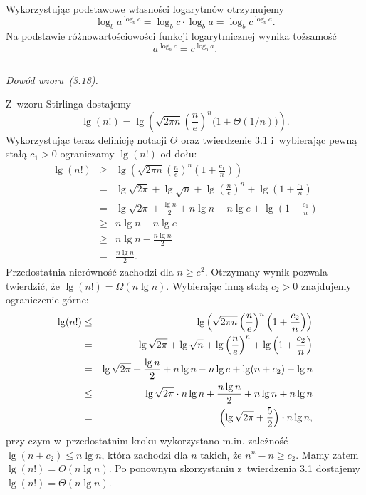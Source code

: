\subsection{} %
Wykorzystując podstawowe własności logarytmów otrzymujemy
\[
	\log_ba^{\log_bc} = \log_bc\cdot\log_ba = \log_bc^{\log_ba}.
\]
Na podstawie różnowartościowości funkcji logarytmicznej wynika tożsamość
\[
	a^{\log_bc} = c^{\log_ba}.
\]

\subsection{} %
\noindent\emph{Dowód wzoru~(3.18).}

\noindent Z~wzoru Stirlinga dostajemy
\[
	\lg(n!) = \lg\left(\sqrt{2\pi n}\left(\frac{n}{e}\right)^n\bigl(1+\Theta(1/n)\bigr)\right).
\]
Wykorzystując teraz definicję notacji $\Theta$ oraz twierdzenie 3.1 i~wybierając pewną stałą $c_1>0$ ograniczamy $\lg(n!)$ od dołu:
\begin{eqnarray*}
	\lg(n!) &\ge& \lg\left(\sqrt{2\pi n}\left(\frac{n}{e}\right)^n\left(1+\frac{c_1}{n}\right)\right) \\
	&=& \lg\sqrt{2\pi}+\lg\sqrt{n}+\lg\left(\frac{n}{e}\right)^n+\lg\left(1+\frac{c_1}{n}\right) \\
	&=& \lg\sqrt{2\pi}+\frac{\lg n}{2}+n\lg n-n\lg e+\lg\left(1+\frac{c_1}{n}\right) \\
	&\ge& n\lg n-n\lg e\\
	&\ge& n\lg n-\frac{n\lg n}{2} \\
	&=& \frac{n\lg n}{2}.
\end{eqnarray*}
Przedostatnia nierówność zachodzi dla $n\ge e^2$. Otrzymany wynik pozwala twierdzić, że $\lg(n!)=\Omega(n\lg n)$. Wybierając inną stałą $c_2>0$ znajdujemy ograniczenie górne:
\begin{eqnarray*}
	\lg(n!) &\le& \lg\left(\sqrt{2\pi n}\left(\frac{n}{e}\right)^n\left(1+\frac{c_2}{n}\right)\right) \\
	&=& \lg\sqrt{2\pi}+\lg\sqrt{n}+\lg\left(\frac{n}{e}\right)^n+\lg\left(1+\frac{c_2}{n}\right) \\
	&=& \lg\sqrt{2\pi}+\frac{\lg n}{2}+n\lg n-n\lg e+\lg(n+c_2)-\lg n\\
	&\le& \lg\sqrt{2\pi}\cdot n\lg n+\frac{n\lg n}{2}+n\lg n+n\lg n\\
	&=& \Bigl(\lg\sqrt{2\pi}+\frac{5}{2}\Bigr)\cdot n\lg n,
\end{eqnarray*}
przy czym w~przedostatnim kroku wykorzystano m.in. zależność $\lg(n+c_2)\le n\lg n$, która zachodzi dla $n$ takich, że $n^n-n\ge c_2$. Mamy zatem $\lg(n!)=O(n\lg n)$. Po ponownym skorzystaniu z~twierdzenia 3.1 dostajemy $\lg(n!)=\Theta(n\lg n)$.\\

